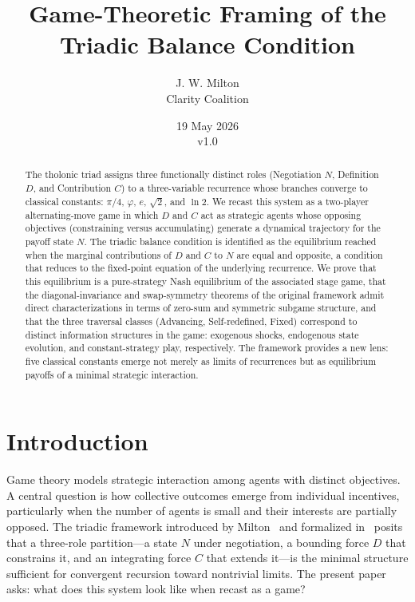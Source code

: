 \documentclass[12pt]{article}
\title{Game-Theoretic Framing of the Triadic Balance Condition}
\author{J. W. Milton\\[4pt]\small Clarity Coalition}
\date{19 May 2026 \\ \small v1.0}
\theoremstyle{definition}
\theoremstyle{remark}
\begin{document}
\maketitle

\begin{abstract}
The tholonic triad assigns three functionally distinct roles (Negotiation $N$,
Definition $D$, and Contribution $C$) to a three-variable recurrence whose branches
converge to classical constants: $\pi/4$, $\varphi$, $e$, $\sqrt{2}$, and $\ln 2$.
We recast this system as a two-player alternating-move game in which $D$ and $C$ act
as strategic agents whose opposing objectives (constraining versus accumulating) generate
a dynamical trajectory for the payoff state $N$.  The triadic balance condition is
identified as the equilibrium reached when the marginal contributions of $D$ and $C$ to
$N$ are equal and opposite, a condition that reduces to the fixed-point equation of the
underlying recurrence.  We prove that this equilibrium is a pure-strategy Nash
equilibrium of the associated stage game, that the diagonal-invariance and swap-symmetry
theorems of the original framework admit direct characterizations in terms of zero-sum
and symmetric subgame structure, and that the three traversal classes (Advancing,
Self-redefined, Fixed) correspond to distinct information structures in the game:
exogenous shocks, endogenous state evolution, and constant-strategy play, respectively.
The framework provides a new lens: five classical constants emerge not merely as limits
of recurrences but as equilibrium payoffs of a minimal strategic interaction.
\end{abstract}

\tableofcontents
\newpage

\section{Introduction}

Game theory models strategic interaction among agents with distinct objectives.
A central question is how collective outcomes emerge from individual incentives,
particularly when the number of agents is small and their interests are partially
opposed.  The triadic framework introduced by Milton~\cite{Mil24} and formalized
in~\cite{Mil26a} posits that a three-role partition---a state $N$ under negotiation,
a bounding force $D$ that constrains it, and an integrating force $C$ that extends
it---is the minimal structure sufficient for convergent recursion toward nontrivial
limits.  The present paper asks: what does this system look like when recast as a game?
\end{document}
